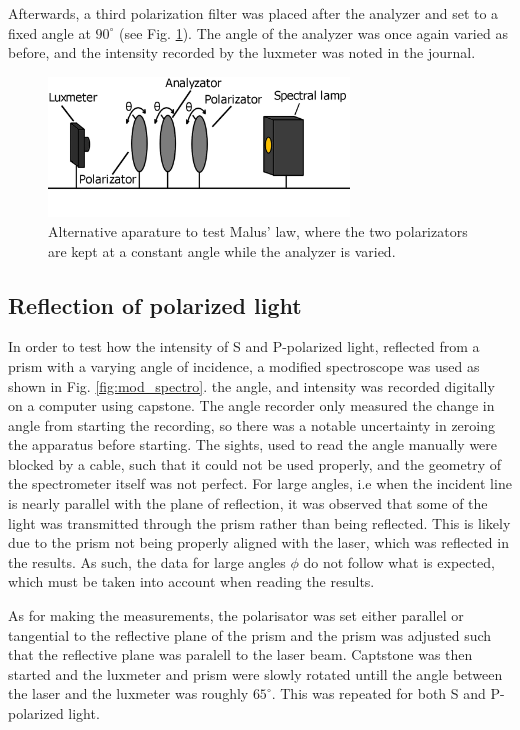\documentclass[11pt,a4paper]{article}
\begin{document}
    Afterwards, a third polarization filter was placed after the analyzer and set to a fixed angle at $90^\circ$ (see Fig. \ref{fig:lux_pola_ana_pola_lamp}). The angle of the analyzer was once again varied as before, and the intensity recorded by the luxmeter was noted in the journal.

    \begin{figure}[H]
      \center
      \includegraphics[width=8cm]{scripts/figs/diagram_3.png}
      \caption{Alternative aparature to test Malus' law, where the two polarizators are kept at a constant angle while the analyzer is varied.}
      \label{fig:lux_pola_ana_pola_lamp}
    \end{figure}

    \subsection{Reflection of polarized light\label{subsect:reflection_experimental}}
      In order to test how the intensity of S and P-polarized light, reflected from a prism with a varying angle of incidence, a modified spectroscope was used as shown in Fig. \ref{fig:mod_spectro}. the angle, and intensity was recorded digitally on a computer using capstone. The angle recorder only measured the change in angle from starting the recording, so there was a notable uncertainty in zeroing the apparatus before starting. The sights, used to read the angle manually were blocked by a cable, such that it could not be used properly, and the geometry of the spectrometer itself was not perfect. For large angles, i.e when the incident line is nearly parallel with the plane of reflection, it was observed that some of the light was transmitted through the prism rather than being reflected. This is likely due to the prism not being properly aligned with the laser, which was reflected in the results. As such, the data for large angles $\phi$ do not follow what is expected, which must be taken into account when reading the results.

      As for making the measurements, the polarisator was set either parallel or tangential to the reflective plane of the prism and the prism was adjusted such that the reflective plane was paralell to the laser beam. Captstone was then started and the luxmeter and prism were slowly rotated untill the angle between the laser and the luxmeter was roughly $65^\circ$. This was repeated for both S and P-polarized light.
\end{document}
